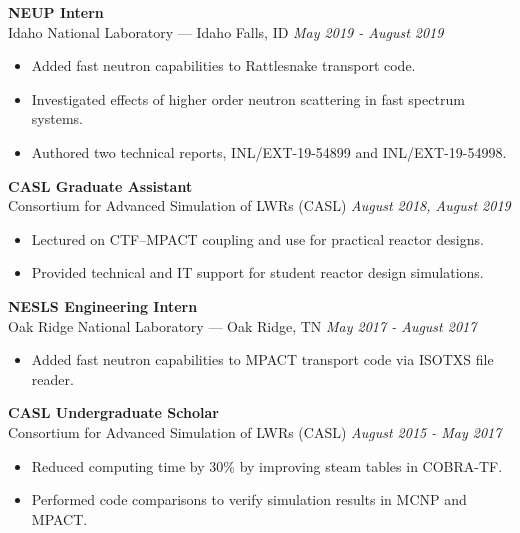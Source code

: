 \documentclass[margin, 10pt]{res}
\newcommand{\backwardspace}{-8pt}
\begin{document}
\begin{resume}
\textbf{NEUP Intern}\\
Idaho National Laboratory --- Idaho Falls, ID \hfill \textit{May 2019 - August 2019}
\begin{itemize}
    \item Added fast neutron capabilities to Rattlesnake transport code.
    \item Investigated effects of higher order neutron scattering in fast spectrum systems.
    \item Authored two technical reports, INL/EXT-19-54899 and INL/EXT-19-54998.
\end{itemize}

\vspace{\backwardspace}
\textbf{CASL Graduate Assistant}\\
Consortium for Advanced Simulation of LWRs (CASL) \hfill \textit{August 2018, August 2019}
\begin{itemize}
    \item Lectured on CTF--MPACT coupling and use for practical reactor designs.
    \item Provided technical and IT support for student reactor design simulations.
\end{itemize}

\vspace{\backwardspace}
\textbf{NESLS Engineering Intern}\\
Oak Ridge National Laboratory --- Oak Ridge, TN \hfill \textit{May 2017 - August 2017}
\begin{itemize}
    \item Added fast neutron capabilities to MPACT transport code via ISOTXS file reader.
\end{itemize}

\vspace{\backwardspace}
\textbf{CASL Undergraduate Scholar} \\
Consortium for Advanced Simulation of LWRs (CASL) \hfill 
  \textit{August 2015 - May 2017}
\begin{itemize}
    \item Reduced computing time by 30\% by improving steam tables in COBRA-TF.
    \item Performed code comparisons to verify simulation results in MCNP and MPACT.
\end{itemize}


\end{resume}
\end{document}
